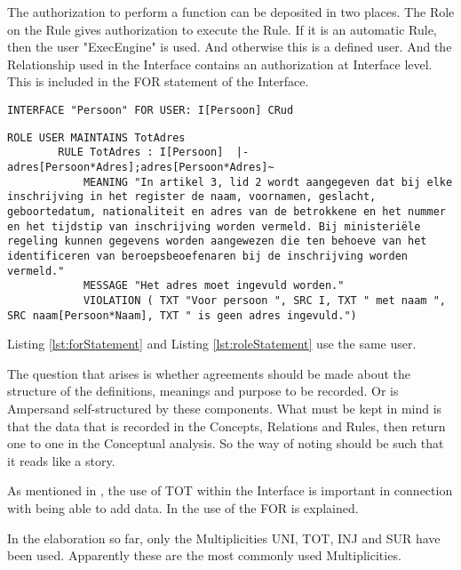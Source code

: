 The authorization to perform a function can be deposited in two places.
The Role on the Rule gives authorization to execute the Rule.
If it is an automatic Rule, then the user "ExecEngine" is used.
And otherwise this is a defined user.
And the Relationship used in the Interface contains an authorization at Interface level.
This is included in the FOR statement of the Interface.
\begin{lstlisting}[caption=Persoon.adl FOR statement, numbers=none, label={lst:forStatement}]
    INTERFACE "Persoon" FOR USER: I[Persoon] CRud
\end{lstlisting}
\begin{lstlisting}[caption=Persoon.adl FOR statement, numbers=none, label={lst:roleStatement}]
        ROLE USER MAINTAINS TotAdres
        RULE TotAdres : I[Persoon]  |-  adres[Persoon*Adres];adres[Persoon*Adres]~
            MEANING "In artikel 3, lid 2 wordt aangegeven dat bij elke inschrijving in het register de naam, voornamen, geslacht, geboortedatum, nationaliteit en adres van de betrokkene en het nummer en het tijdstip van inschrijving worden vermeld. Bij ministeriële regeling kunnen gegevens worden aangewezen die ten behoeve van het identificeren van beroepsbeoefenaren bij de inschrijving worden vermeld."
            MESSAGE "Het adres moet ingevuld worden."
            VIOLATION ( TXT "Voor persoon ", SRC I, TXT " met naam ", SRC naam[Persoon*Naam], TXT " is geen adres ingevuld.")
\end{lstlisting}
Listing \ref{lst:forStatement} and Listing \ref{lst:roleStatement} use the same user.

The question that arises is whether agreements should be made about the structure of the definitions, meanings and purpose to be recorded.
Or is Ampersand self-structured by these components.
What must be kept in mind is that the data that is recorded in the Concepts, Relations and Rules, then return one to one in the Conceptual analysis.
So the way of noting should be such that it reads like a story.

As mentioned in , the use of TOT within the Interface is important in connection with being able to add data.
In  the use of the FOR is explained.

In the elaboration so far, only the Multiplicities UNI, TOT, INJ and SUR have been used.
Apparently these are the most commonly used Multiplicities.


